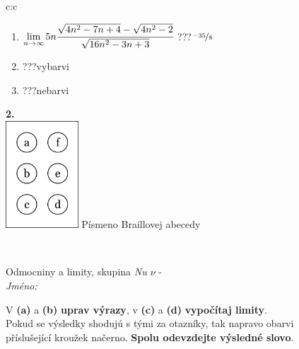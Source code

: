 \documentclass[10pt]{report}
\begin{document}
\begin{tabular}{c:c}
\begin{minipage}[c][104.5mm][t]{0.5\linewidth}
\begin{center}
\begin{minipage}{0.79\linewidth}
\begin{center}
\begin{varwidth}{\linewidth}
\begin{enumerate}
\item $\lim\limits_{n\to\infty}5n\cfrac{\sqrt{4n^2-7n+4}-\sqrt{4n^2-2}}{\sqrt{16n^2-3n+3}}$\quad \dotfill\; ???\;\dotfill \quad $\nicefrac{-35}{8}$
\item \quad \dotfill\; ???\;\dotfill \quad vybarvi
\item \quad \dotfill\; ???\;\dotfill \quad nebarvi
\end{enumerate}
\end{varwidth}
\end{center}
\end{minipage}
\begin{minipage}{0.20\linewidth}
\begin{center}
{\Huge\bfseries 2.} \\[2mm]
\includegraphics[height=40mm]{../images/braille.png}
{\small Písmeno Braillovej abecedy}
\end{center}
\end{minipage}
\end{center}
\end{minipage}
\\ \hdashline
\begin{minipage}[c][104.5mm][t]{0.5\linewidth}
\begin{center}
\vspace{7mm}
{\huge Odmocniny a limity, skupina \textit{Nu $\nu$} -}\\[5mm]
\textit{Jméno:}\phantom{xxxxxxxxxxxxxxxxxxxxxxxxxxxxxxxxxxxxxxxxxxxxxxxxxxxxxxxxxxxxxxxxx}\\[5mm]
\begin{minipage}{0.95\linewidth}
\begin{center}
V \textbf{(a)} a \textbf{(b)} \textbf{uprav výrazy}, v \textbf{(c)} a \textbf{(d)} \textbf{vypočítaj limity}.\\Pokud se výsledky shodujú s tými za otazníky, tak napravo obarvi\\příslušející kroužek načerno. \textbf{Spolu odevzdejte výsledné slovo}.
\end{center}
\end{minipage}
\\[1mm]

\end{center}
\end{minipage}
\end{tabular}
\end{document}
